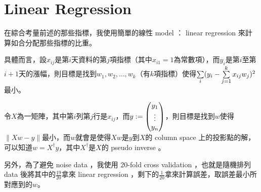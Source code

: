 \section{Linear Regression}

在綜合考量前述的那些指標，我使用簡單的線性 model ： linear regression 來計算如合分配那些指標的比重。

具體而言，設$x_{ij}$是第$i$天資料的第$j$項指標（其中$x_{i1}=1$為常數項），而$y_i$是第$i$至第$i+1$天的漲幅，則目標是找到$w_1, w_2, \dots, w_k$（有$k$項指標）使得$\sum\limits_i(y_i-\sum\limits_{j=1}^kx_{ij}w_j)^2$最小。

令$X$為一矩陣，其中第$i$列第$j$行是$x_{ij}$，而$y:=\begin{pmatrix}y_1\\\vdots\\y_n\end{pmatrix}$，則目標是找到$w$使得$\|Xw-y\|$最小，而$w$就會是使得$Xw$是$y$到$X$的 column space 上的投影點的解，可以知道$w=X^\dagger y$，其中$X^\dagger$是$X$的 pseudo inverse 。

另外，為了避免 noise data ，我使用 $20$-fold cross validation ，也就是隨機排列 data 後將其中的$\frac{19}{20}$拿來 linear regression ，剩下的$\frac1{20}$拿來計算誤差，取誤差最小所對應到的$w$。
